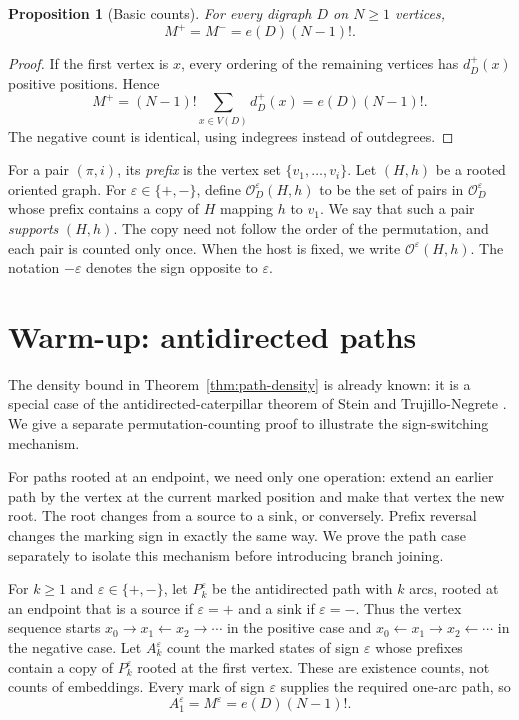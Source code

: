 \documentclass[11pt]{article}
\numberwithin{equation}{section}
\newtheorem{proposition}[theorem]{Proposition}
\theoremstyle{definition}
\newcommand{\cO}{\mathcal O}
\begin{document}
\begin{proposition}[Basic counts]
\label{prop:digraph-normalization}
For every digraph $D$ on $N\geq1$ vertices,
\begin{equation}
        M^+=M^-=e(D)(N-1)!.
        \label{eq:digraph-normalization}
\end{equation}
\end{proposition}

\begin{proof}
If the first vertex is $x$, every ordering of the remaining vertices has
$d_D^+(x)$ positive positions.  Hence
\[
 M^+=(N-1)!\sum_{x\in V(D)}d_D^+(x)
     =e(D)(N-1)!.
\]
The negative count is identical, using indegrees instead of outdegrees.
\end{proof}

For a pair $(\pi,i)$, its \emph{prefix} is the vertex set
$\{v_1,\ldots,v_i\}$.  Let $(H,h)$ be a rooted oriented graph.
For $\varepsilon\in\{+,-\}$, define $\cO_D^\varepsilon(H,h)$ to be
the set of pairs in $\cO_D^\varepsilon$ whose prefix contains a copy
of $H$ mapping $h$ to $v_1$.  We say that such a pair \emph{supports}
$(H,h)$.  The copy need not follow the order of the permutation,
and each pair is counted only once.  When the host is fixed, we write
$\cO^\varepsilon(H,h)$.  The notation $-\varepsilon$ denotes the sign
opposite to $\varepsilon$.

\section{Warm-up: antidirected paths}
\label{sec:path-warmup}

The density bound in Theorem~\ref{thm:path-density} is already known:
it is a special case of the antidirected-caterpillar theorem of Stein
and Trujillo-Negrete \cite{SteinTrujilloNegrete2025}.  We give a
separate permutation-counting proof to illustrate the sign-switching
mechanism.

For paths rooted at an endpoint, we need only one operation: extend
an earlier path by the vertex at the current marked position and make
that vertex the new root.  The root changes from a source to a sink,
or conversely.  Prefix reversal changes the marking sign in exactly
the same way.  We prove the path case separately to isolate this
mechanism before introducing branch joining.

For $k\geq1$ and $\varepsilon\in\{+,-\}$, let $P_k^\varepsilon$ be
the antidirected path with $k$ arcs, rooted at an endpoint that is a
source if $\varepsilon=+$ and a sink if $\varepsilon=-$.  Thus the
vertex sequence starts $x_0\to x_1\leftarrow x_2\to\cdots$ in the
positive case and $x_0\leftarrow x_1\to x_2\leftarrow\cdots$ in the
negative case.  Let $A_k^\varepsilon$ count the marked states of sign
$\varepsilon$ whose prefixes contain a copy of $P_k^\varepsilon$
rooted at the first vertex.  These are existence counts, not counts
of embeddings.  Every mark of sign $\varepsilon$ supplies the
required one-arc path, so
\begin{equation}
 A_1^\varepsilon=M^\varepsilon=e(D)(N-1)!.
 \label{eq:path-base}
\end{equation}
\end{document}
